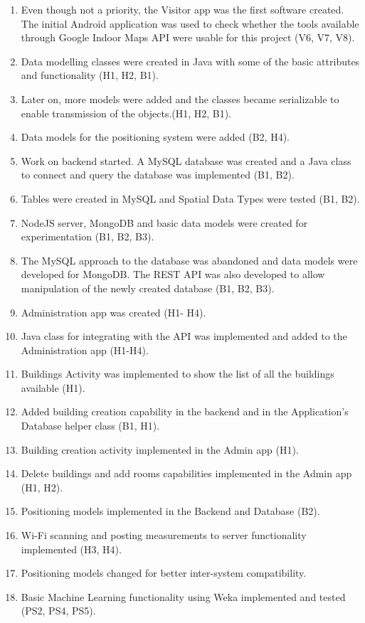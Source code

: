 \begin{enumerate}
	\item Even though not a priority, the Visitor app was the first software created. The initial Android application was used to check whether the tools available through Google Indoor Maps API were usable for this project (V6, V7, V8).
	\item Data modelling classes were created in Java with some of the basic attributes and functionality (H1, H2, B1).
	\item Later on, more models were added and the classes became serializable to enable transmission of the objects.(H1, H2, B1).
	\item Data models for the positioning system were added (B2, H4).
	\item Work on backend started. A MySQL database was created and a Java class to connect and query the database was implemented (B1, B2).
	\item Tables were created in MySQL and Spatial Data Types were tested (B1, B2).
	\item NodeJS server, MongoDB and basic data models were created for experimentation (B1, B2, B3).
	\item The MySQL approach to the database was abandoned and data models were developed for MongoDB. The REST API was also developed to allow manipulation of the newly created database (B1, B2, B3).
	\item  Administration app was created (H1- H4).
	\item Java class for integrating with the API was implemented and added to the Administration app (H1-H4).
	\item Buildings Activity was implemented to show the list of all the buildings available (H1).
	\item Added building creation capability in the backend and in the Application's Database helper class (B1, H1).
	\item Building creation activity implemented in the Admin app (H1).
	\item Delete buildings and add rooms capabilities implemented in the Admin app (H1, H2).
	\item Positioning models implemented in the Backend and Database (B2).
	\item Wi-Fi scanning and posting measurements to server functionality implemented (H3, H4). 
	\item Positioning models changed for better inter-system compatibility.
	\item Basic Machine Learning functionality using Weka implemented and tested (PS2, PS4, PS5).

\end{enumerate}
